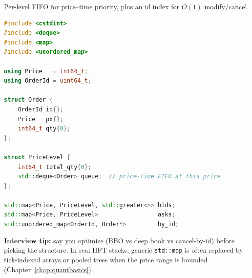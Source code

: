 Per-level FIFO for price--time priority, plus an id index for $O(1)$ modify/cancel.
\begin{lstlisting}[language=C++]
#include <cstdint>
#include <deque>
#include <map>
#include <unordered_map>

using Price   = int64_t;
using OrderId = uint64_t;

struct Order {
    OrderId id{};
    Price   px{};
    int64_t qty{0};
};

struct PriceLevel {
    int64_t total_qty{0};
    std::deque<Order> queue;  // price-time FIFO at this price
};

std::map<Price, PriceLevel, std::greater<>> bids;
std::map<Price, PriceLevel>                 asks;
std::unordered_map<OrderId, Order*>         by_id;
\end{lstlisting}
\par\noindent\textbf{Interview tip:} say  you optimize (BBO vs deep book vs cancel-by-id) before 
picking the structure. In real HFT stacks, generic \texttt{std::map} is often replaced by 
tick-indexed arrays or pooled trees when the price range is bounded 
(Chapter~\ref{chap:quantbasics}).

